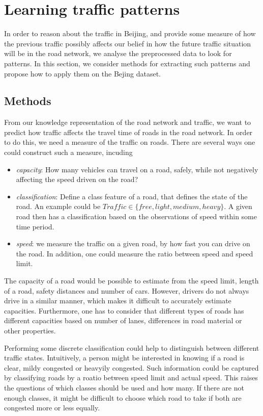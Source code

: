\section{Learning traffic patterns}\label{traffic-patterns}
In order to reason about the traffic in Beijing, and provide some measure of how the previous traffic possibly affects our belief in how the future traffic situation will be in the road network, we analyse the preprocessed data to look for patterns. In this section, we consider methods for extracting such patterns and propose how to apply them on the Bejing dataset.
\subsection{Methods}\label{patterns:methods}
From our knowledge representation of the road network and traffic, we want to predict how traffic affects the travel time of roads in the road network. In order to do this, we need a measure of the traffic on roads. There are several ways one could construct such a measure, incuding
\begin{itemize}
\item \emph{capacity}: How many vehicles can travel on a road, safely, while not negatively affecting the speed driven on the road?
\item \emph{classification}: Define a class feature of a road, that defines the state of the road. An example could be $Traffic \in \{free, light, medium, heavy\}$. A given road then has a classification based on the observations of speed within some time period.
\item \emph{speed}: we measure the traffic on a given road, by how fast you can drive on the road. In addition, one could measure the ratio between speed and speed limit.
\end{itemize}
The capacity of a road would be possible to estimate from the speed limit, length of a road, safety distances and number of cars. However, drivers do not always drive in a similar manner, which makes it difficult to accurately estimate capacities. Furthermore, one has to consider that different types of roads has different capacities based on number of lanes, differences in road material or other properties.

Performing some discrete classification could help to distinguish between different traffic states. Intuitively, a person might be interested in knowing if a road is clear, mildy congested or heavyily congested. Such information could be captured by classifying roads by a roatio between speed limit and actual speed. This raises the questions of which classes should be used and how many. If there are not enough classes, it might be difficult to choose which road to take if both are congested more or less equally.\par

